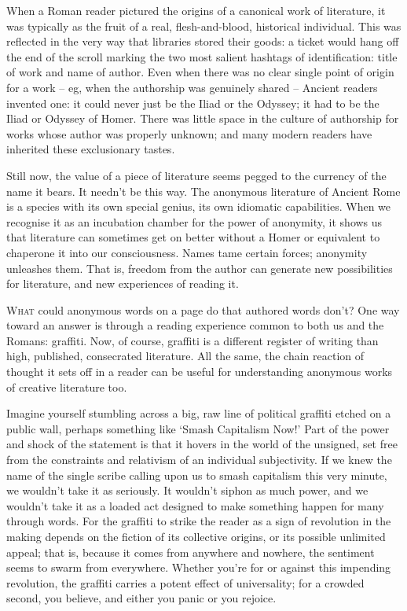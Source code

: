 \documentclass[../main.tex]{subfiles}
\begin{document}
\begin{multicols}{2}
When a Roman reader pictured the origins of a canonical work of literature, it was typically as the fruit of a real, flesh-and-blood, historical individual. This was reflected in the very way that libraries stored their goods: a ticket would hang off the end of the scroll marking the two most salient hashtags of identification: title of work and name of author. Even when there was no clear single point of origin for a work – eg, when the authorship was genuinely shared – Ancient readers invented one: it could never just be the Iliad or the Odyssey; it had to be the Iliad or Odyssey of Homer. There was little space in the culture of authorship for works whose author was properly unknown; and many modern readers have inherited these exclusionary tastes. 

Still now, the value of a piece of literature seems pegged to the currency of the name it bears. It needn’t be this way. The anonymous literature of Ancient Rome is a species with its own special genius, its own idiomatic capabilities. When we recognise it as an incubation chamber for the power of anonymity, it shows us that literature can sometimes get on better without a Homer or equivalent to chaperone it into our consciousness. Names tame certain forces; anonymity unleashes them. That is, freedom from the author can generate new possibilities for literature, and new experiences of reading it. 

\lettrine{W}{hat} could anonymous words on a page do that authored words don’t? One way toward an answer is through a reading experience common to both us and the Romans: graffiti. Now, of course, graffiti is a different register of writing than high, published, consecrated literature. All the same, the chain reaction of thought it sets off in a reader can be useful for understanding anonymous works of creative literature too. 

Imagine yourself stumbling across a big, raw line of political graffiti etched on a public wall, perhaps something like ‘Smash Capitalism Now!’ Part of the power and shock of the statement is that it hovers in the world of the unsigned, set free from the constraints and relativism of an individual subjectivity. If we knew the name of the single scribe calling upon us to smash capitalism this very minute, we wouldn’t take it as seriously. It wouldn’t siphon as much power, and we wouldn’t take it as a loaded act designed to make something happen for many through words. For the graffiti to strike the reader as a sign of revolution in the making depends on the fiction of its collective origins, or its possible unlimited appeal; that is, because it comes from anywhere and nowhere, the sentiment seems to swarm from everywhere. Whether you’re for or against this impending revolution, the graffiti carries a potent effect of universality; for a crowded second, you believe, and either you panic or you rejoice. 


\end{multicols}
\end{document}

